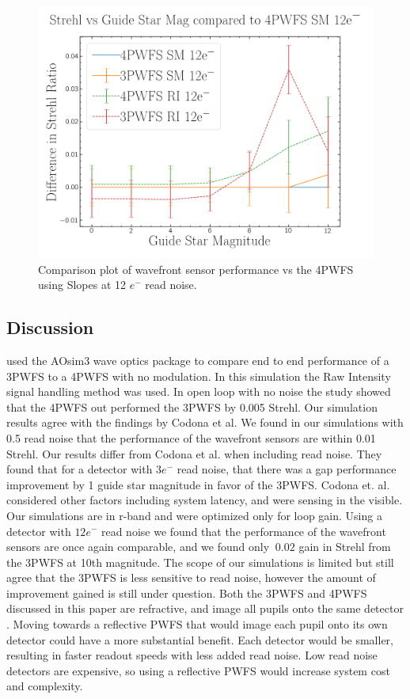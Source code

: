 \begin{figure}[h]
    \centering
    \includegraphics[width=.7\linewidth]{Chapter Materials/Chapter Four Materials/StrehlvGuideStarvs4PWFSRM12e.png}
    \caption{Comparison plot of wavefront sensor performance vs the 4PWFS using Slopes at 12 $e^-$ read noise.}
    \label{fig:12RN}
\end{figure}

\subsection{Discussion}


\cite{codona2018comparative} used the AOsim3 wave optics package to compare end to end performance of a 3PWFS to a 4PWFS with no modulation. In this simulation the Raw Intensity  signal handling method was used. In open loop with no noise the study showed that the 4PWFS out performed the 3PWFS by 0.005 Strehl. Our simulation results agree with the findings by Codona et al. We found in our simulations with 0.5 read noise that the performance of the wavefront sensors are within 0.01 Strehl. Our results differ from Codona et al. when including read noise. They found that for a detector with $3e^-$ read noise, that there was a gap performance improvement by 1 guide star magnitude in favor of the 3PWFS. Codona et. al. considered other factors including system latency, and were sensing in the visible. Our simulations are in r-band and were optimized only for loop gain. Using a detector with $12 e^-$ read noise we found that the performance of the wavefront sensors are once again comparable, and we found only $~0.02$ gain in Strehl from the 3PWFS at 10th magnitude. The scope of our simulations is limited but still agree that the 3PWFS is less sensitive to read noise, however the amount of improvement gained is still under question. Both the 3PWFS and 4PWFS discussed in this paper are refractive, and image all pupils onto the same detector \citep{sanchez2020design}. Moving towards a reflective PWFS that would image each pupil onto its own detector could have a more substantial benefit. Each detector would be smaller, resulting in faster readout speeds with less added read noise. Low read noise detectors are expensive, so using a reflective PWFS would increase system cost and complexity.

\newpage